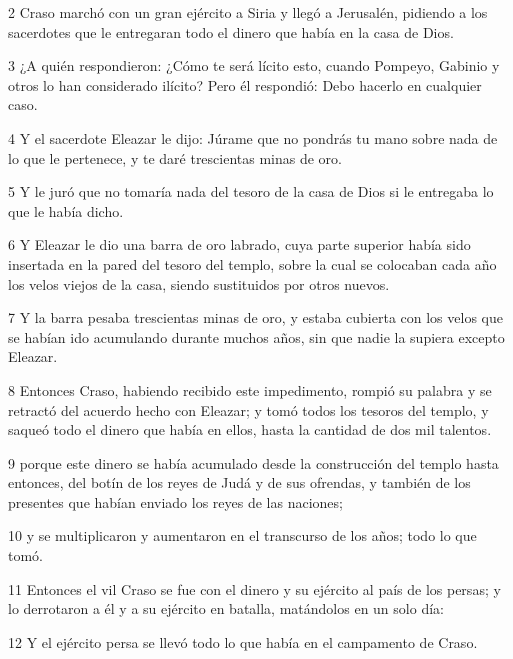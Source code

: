 \par 2 Craso marchó con un gran ejército a Siria y llegó a Jerusalén, pidiendo a los sacerdotes que le entregaran todo el dinero que había en la casa de Dios.

\par 3 ¿A quién respondieron: ¿Cómo te será lícito esto, cuando Pompeyo, Gabinio y otros lo han considerado ilícito? Pero él respondió: Debo hacerlo en cualquier caso.

\par 4 Y el sacerdote Eleazar le dijo: Júrame que no pondrás tu mano sobre nada de lo que le pertenece, y te daré trescientas minas de oro.

\par 5 Y le juró que no tomaría nada del tesoro de la casa de Dios si le entregaba lo que le había dicho.

\par 6 Y Eleazar le dio una barra de oro labrado, cuya parte superior había sido insertada en la pared del tesoro del templo, sobre la cual se colocaban cada año los velos viejos de la casa, siendo sustituidos por otros nuevos.

\par 7 Y la barra pesaba trescientas minas de oro, y estaba cubierta con los velos que se habían ido acumulando durante muchos años, sin que nadie la supiera excepto Eleazar.

\par 8 Entonces Craso, habiendo recibido este impedimento, rompió su palabra y se retractó del acuerdo hecho con Eleazar; y tomó todos los tesoros del templo, y saqueó todo el dinero que había en ellos, hasta la cantidad de dos mil talentos.

\par 9 porque este dinero se había acumulado desde la construcción del templo hasta entonces, del botín de los reyes de Judá y de sus ofrendas, y también de los presentes que habían enviado los reyes de las naciones;

\par 10 y se multiplicaron y aumentaron en el transcurso de los años; todo lo que tomó.

\par 11 Entonces el vil Craso se fue con el dinero y su ejército al país de los persas; y lo derrotaron a él y a su ejército en batalla, matándolos en un solo día:

\par 12 Y el ejército persa se llevó todo lo que había en el campamento de Craso.

